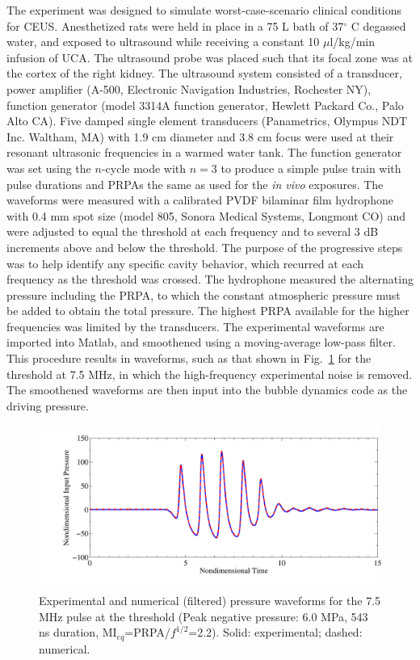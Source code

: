 The experiment was designed to simulate worst-case-scenario clinical
conditions for CEUS. Anesthetized rats were held in place in a 75 L
bath of 37$ ^\circ$ C degassed water, and exposed to ultrasound while
receiving a constant 10 $\mu$l/kg/min infusion of UCA.  The ultrasound
probe was placed such that its focal zone was at the cortex of the
right kidney.  The ultrasound system consisted of a transducer, power
amplifier (A-500, Electronic Navigation Industries, Rochester NY),
function generator (model 3314A function generator, Hewlett Packard
Co., Palo Alto CA).  Five damped single element transducers
(Panametrics, Olympus NDT Inc. Waltham, MA) with 1.9 cm diameter and
3.8 cm focus were used at their resonant ultrasonic frequencies in a
warmed water tank.  The function generator was set using the $n$-cycle
mode with $n=3$ to produce a simple pulse train with pulse durations
and PRPAs the same as used for the \textit{in vivo} exposures.  The
waveforms were measured with a calibrated PVDF bilaminar film
hydrophone with 0.4 mm spot size (model 805, Sonora Medical Systems,
Longmont CO) and were adjusted to equal the threshold at each
frequency and to several 3 dB increments above and below the
threshold.  The purpose of the progressive steps was to help identify
any specific cavity behavior, which recurred at each frequency as the
threshold was crossed.  The hydrophone measured the alternating
pressure including the PRPA, to which the constant atmospheric
pressure must be added to obtain the total pressure.  The highest PRPA
available for the higher frequencies was limited by the transducers.
The experimental waveforms are imported into Matlab, and smoothened
using a moving-average low-pass filter. This procedure results in
waveforms, such as that shown in Fig.~\ref{fig:waveforms} for the
threshold at 7.5 MHz, in which the high-frequency experimental noise
is removed. The smoothened waveforms are then input into the bubble
dynamics code as the driving pressure.

\begin{figure}[!t]
  \centering \includegraphics[width=\textwidth]{./figs/bubble_figs/PexpPsmooth}
  \caption{Experimental and numerical (filtered) pressure waveforms
    for the 7.5 MHz pulse at the threshold (Peak negative pressure:
    6.0 MPa, 543 ns duration, MI$_{eq}$=PRPA/$f^{1/2}$=2.2). Solid:
    experimental; dashed: numerical.}
  \label{fig:waveforms}
\end{figure}


